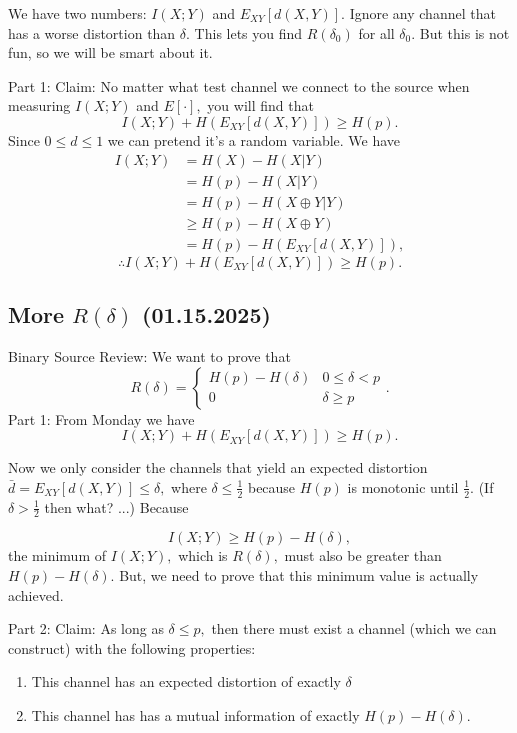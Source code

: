 \documentclass[12pt]{article}
\theoremstyle{remark}
\begin{document}
We have two numbers: $I(X;Y)$ and $E_{XY}[d(X,Y)].$ Ignore any channel that has a worse distortion than $\delta.$ This lets you find $R(\delta_0)$ for all $\delta_0.$ But this is not fun, so we will be smart about it.


Part 1:
Claim: No matter what test channel we connect to the source when measuring $I(X;Y)$ and $E[\cdot],$ you will find that
\[I(X;Y)+H(E_{XY}[d(X,Y)])\ge H(p).\] Since $0\le d\le 1$ we can pretend it's a random variable. 
We have
\begin{align*}I(X;Y)&=H(X)-H(X|Y)\\
&=H(p)-H(X|Y)\\
&=H(p)-H(X\oplus Y|Y)\\
&\ge H(p)-H(X\oplus Y)\\
&=H(p)-H(E_{XY}[d(X,Y)]),
\end{align*}
\[\therefore I(X;Y)+H(E_{XY}[d(X,Y)])\ge H(p).\label{bsrcpt1}\]

\subsection{More $R(\delta)$ (01.15.2025)}

Binary Source Review:
We want to prove that
\[R(\delta)=\begin{cases}
    H(p)-H(\delta)&0\le\delta<p\\
    0&\delta\ge p
\end{cases}.\]
Part 1:
From Monday we have
\[I(X;Y)+H(E_{XY}[d(X,Y)])\ge H(p).\]

Now we only consider the channels that yield an expected distortion $\bar{d}=E_{XY}[d(X,Y)]\le\delta,$ where $\delta\le\frac{1}{2}$ because $H(p)$ is monotonic until $\frac{1}{2}.$ (If $\delta>\frac{1}{2}$ then what? ...) Because

\[I(X;Y)\ge H(p)-H(\delta),\] the minimum of $I(X;Y),$ which is $R(\delta),$ must also be greater than $H(p)-H(\delta).$ But, we need to prove that this minimum value is actually achieved.

Part 2:
Claim: As long as $\delta\le p,$ then there must exist a channel (which we can construct) with the following properties:
\begin{enumerate}
    \item This channel has an expected distortion of exactly $\delta$
    \item This channel has has a mutual information of exactly $H(p)-H(\delta).$
\end{enumerate}
\end{document}

